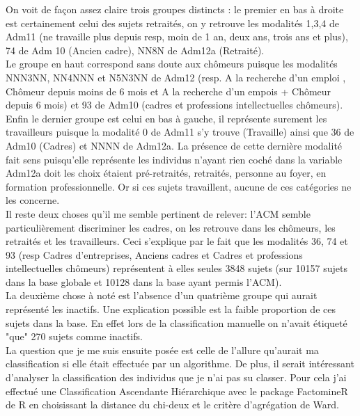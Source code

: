 \documentclass{book}
\begin{document}
On voit de façon assez claire trois groupes distincts : le premier en bas à droite est certainement celui des sujets retraités, on y retrouve les modalités 1,3,4 de Adm11 (ne travaille plus depuis resp, moin de 1 an, deux ans, trois ans et plus), 74 de Adm 10 (Ancien cadre), NN8N de Adm12a (Retraité).\\
Le groupe en haut correspond sans doute aux chômeurs puisque les modalités NNN3NN, NN4NNN et N5N3NN de Adm12 (resp. A la recherche d'un emploi , Chômeur depuis moins de 6 mois et A la recherche d'un empois + Chômeur depuis 6 mois) et 93 de Adm10 (cadres et professions intellectuelles chômeurs).\\
Enfin le dernier groupe est celui en bas à gauche, il représente surement les travailleurs puisque la modalité 0 de Adm11 s'y trouve (Travaille) ainsi que 36 de Adm10 (Cadres) et NNNN de Adm12a. La présence de cette dernière modalité fait sens puisqu'elle représente les individus n'ayant rien coché dans la variable Adm12a doit les choix étaient pré-retraités, retraités, personne au foyer, en formation professionnelle. Or si ces sujets travaillent, aucune de ces catégories ne les concerne.\\
Il reste deux choses qu'il me semble pertinent de relever: l'ACM semble particulièrement discriminer les cadres, on les retrouve dans les chômeurs, les retraités et les travailleurs. Ceci s'explique par le fait que les modalités 36, 74 et 93 (resp Cadres d'entreprises, Anciens cadres et Cadres et professions intellectuelles chômeurs) représentent à elles seules 3848 sujets (sur 10157 sujets dans la base globale et 10128 dans la base ayant permis l'ACM).\\
La deuxième chose à noté est l'absence d'un quatrième groupe qui aurait représenté les inactifs. Une explication possible est la faible proportion de ces sujets dans la base. En effet lors de la classification manuelle on n'avait étiqueté "que" 270 sujets comme inactifs. \\

\noindent
La question que je me suis ensuite posée est celle de l'allure qu'aurait ma classification si elle était effectuée par un algorithme. De plus, il serait intéressant d'analyser la classification des individus que je n'ai pas su classer.
Pour cela j'ai effectué une Classification Ascendante Hiérarchique avec le package FactomineR de R en choisissant la distance du chi-deux et le critère d'agrégation de Ward.\\
\end{document}
